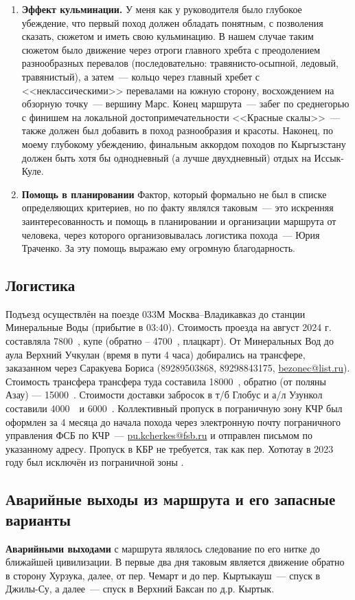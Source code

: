 \begin{enumerate}
	\item \textbf{Эффект кульминации.}
	У меня как у руководителя было глубокое убеждение, что первый поход должен обладать понятным, с позволения сказать, сюжетом и иметь свою кульминацию. В нашем случае таким сюжетом было движение через отроги главного хребта с преодолением разнообразных перевалов (последовательно: травянисто-осыпной, ледовый, травянистый), а затем~--- кольцо через главный хребет с <<неклассическими>> перевалами на южную сторону, восхождением на обзорную точку~--- вершину Марс. Конец маршрута~--- забег по среднегорью с финишем на локальной достопримечательности <<Красные скалы>>~--- также должен был добавить в поход разнообразия и красоты. Наконец, по моему глубокому убеждению, финальным аккордом походов по Кыргызстану должен быть хотя бы  однодневный (а лучше двухдневный) отдых на Иссык-Куле.
	
	\item\textbf{Помощь в планировании}
	Фактор, который формально не был в списке определяющих критериев, но по факту являлся таковым~--- это искренняя заинтересованность и помощь в планировании и организации маршрута от человека, через которого организовывалась логистика похода~--- Юрия Траченко. За эту помощь выражаю ему огромную благодарность.
	
\end{enumerate} 
\subsection{Логистика}
Подъезд осуществлён на поезде 033М Москва--Владикавказ до станции Минеральные Воды (прибытие в 03:40). Стоимость проезда на август 2024 г. составляла 7800~\faRub, купе (обратно – 4700~\faRub, плацкарт). От Минеральных Вод до аула Верхний Учкулан (время в пути 4 часа) добирались на трансфере, заказанном через Саракуева Бориса (89289503868, 89298843175,  \href{mailto: bezonec@list.ru}{bezonec@list.ru}). Стоимость трансфера трансфера туда составила 18000~\faRub, обратно (от поляны Азау) — 15000~\faRub. Стоимости доставки забросок в т/б Глобус и а/л Узункол составили 4000~\faRub~и 6000~\faRub.
Коллективный пропуск в пограничную зону КЧР был оформлен за 4 месяца до начала похода через электронную почту пограничного управления ФСБ по КЧР~--- \href{mailto: pu.kcherkes@fsb.ru}{pu.kcherkes@fsb.ru} и отправлен письмом по указанному адресу. Пропуск в КБР не требуется, так как пер. Хотютау в 2023 году был исключён из пограничной зоны \cite{order_kbr}.
\subsection{Аварийные выходы из маршрута и его запасные варианты}
\textbf{Аварийными выходами} с маршрута являлось следование по его нитке до ближайшей цивилизации. В первые два дня таковым является движение обратно в сторону Хурзука, далее, от пер. Чемарт и до пер. Кыртыкауш~--- спуск в Джилы-Су, а далее~--- спуск в Верхний Баксан по д.р. Кыртык.


